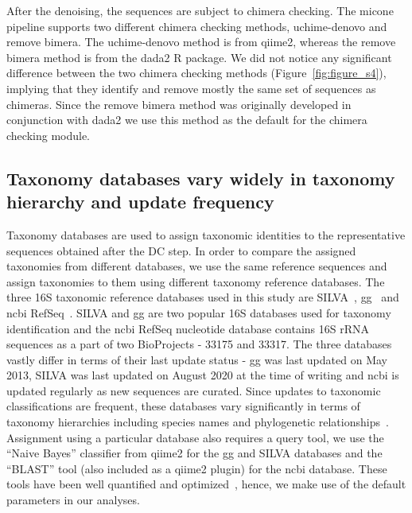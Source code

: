   After the denoising, the sequences are subject to chimera checking.
  The \ac{micone} pipeline supports two different chimera checking methods, uchime-denovo and remove bimera.
  The uchime-denovo method is from \ac{qiime2}, whereas the remove bimera method is from the \ac{dada2} R package.
  We did not notice any significant difference between the two chimera checking methods (Figure~\ref{fig:figure_s4}), implying that they identify and remove mostly the same set of sequences as chimeras.
  Since the remove bimera method was originally developed in conjunction with dada2 we use this method as the default for the chimera checking module.

  \FloatBarrier

  \subsection*{Taxonomy databases vary widely in taxonomy hierarchy and update frequency}

  Taxonomy databases are used to assign taxonomic identities to the representative sequences obtained after the DC step.
  In order to compare the assigned taxonomies from different databases, we use the same reference sequences and assign taxonomies to them using different taxonomy reference databases.
  The three 16S taxonomic reference databases used in this study are SILVA~\cite{Quast2012}, \ac{gg}~\cite{DeSantis2006} and \ac{ncbi} RefSeq~\cite{Sayers2009}.
  SILVA and \ac{gg} are two popular 16S databases used for taxonomy identification and the \ac{ncbi} RefSeq nucleotide database contains 16S rRNA sequences as a part of two BioProjects - 33175 and 33317.
  The three databases vastly differ in terms of their last update status - \ac{gg} was last updated on May 2013, SILVA was last updated on August 2020 at the time of writing and \ac{ncbi} is updated regularly as new sequences are curated.
  Since updates to taxonomic classifications are frequent, these databases vary significantly in terms of taxonomy hierarchies including species names and phylogenetic relationships~\cite{Balvociute2017}.
  Assignment using a particular database also requires a query tool, we use the ``Naive Bayes'' classifier from \ac{qiime2} for the \ac{gg} and SILVA databases and the ``BLAST'' tool (also included as a \ac{qiime2} plugin) for the \ac{ncbi} database.
  These tools have been well quantified and optimized~\cite{bokulichOptimizingTaxonomicClassification2018}, hence, we make use of the default parameters in our analyses.

